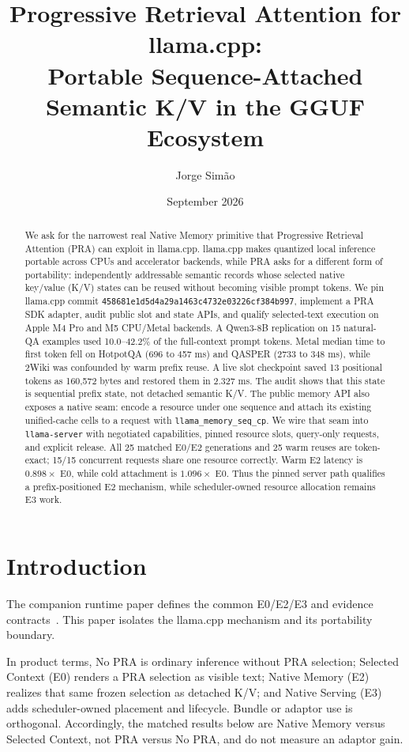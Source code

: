 \documentclass[10pt]{article}
\title{Progressive Retrieval Attention for llama.cpp:\\
Portable Sequence-Attached Semantic K/V in the GGUF Ecosystem}
\author{Jorge Sim\~ao}
\date{September 2026}
\begin{document}
\maketitle

\begin{abstract}
We ask for the narrowest real Native Memory primitive that Progressive
Retrieval Attention (PRA) can exploit in llama.cpp. llama.cpp makes quantized
local inference portable across CPUs and accelerator backends, while PRA asks
for a different form of
portability: independently addressable semantic records whose selected native
key/value (K/V) states can be reused without becoming visible prompt tokens.
We pin llama.cpp commit
\texttt{458681e1d5d4a29a1463c4732e03226cf384b997}, implement a PRA SDK adapter,
audit public slot and state APIs, and qualify selected-text execution on Apple
M4 Pro and M5 CPU/Metal backends. A Qwen3-8B replication on 15 natural-QA
examples used 10.0--42.2\% of the full-context prompt tokens. Metal median time
to first token fell on HotpotQA (696 to 457 ms) and QASPER (2733 to 348 ms),
while 2Wiki was confounded by warm prefix reuse. A live slot checkpoint saved
13 positional tokens as 160,572 bytes and restored them in 2.327 ms. The audit
shows that this state is sequential prefix state, not detached semantic K/V.
The public memory API also exposes a native seam: encode a resource under one
sequence and attach its existing unified-cache cells to a request with
\texttt{llama\_memory\_seq\_cp}. We wire that seam into \texttt{llama-server}
with negotiated capabilities, pinned resource slots, query-only requests, and
explicit release. All 25 matched E0/E2 generations and 25 warm reuses are
token-exact; 15/15 concurrent requests share one resource correctly. Warm E2
latency is $0.898\times$ E0, while cold attachment is $1.096\times$ E0. Thus
the pinned server path qualifies a prefix-positioned E2 mechanism, while
scheduler-owned resource allocation remains E3 work.
\end{abstract}

\section{Introduction}
The companion runtime paper defines the common E0/E2/E3 and evidence
contracts~\cite{praruntime}. This paper isolates the llama.cpp mechanism and
its portability boundary.

In product terms, No PRA is ordinary inference without PRA selection; Selected
Context (E0) renders a PRA selection as visible text; Native Memory (E2)
realizes that same frozen selection as detached K/V; and Native Serving (E3)
adds scheduler-owned placement and lifecycle. Bundle or adaptor use is
orthogonal. Accordingly, the matched results below are Native Memory versus
Selected Context, not PRA versus No PRA, and do not measure an adaptor gain.
\end{document}
